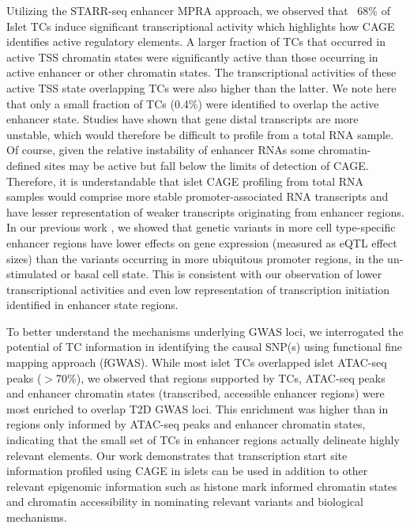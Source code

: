 Utilizing the STARR-seq enhancer MPRA approach, we observed that ~68\% of Islet TCs induce significant transcriptional activity which highlights how CAGE identifies active regulatory elements. A larger fraction of TCs that occurred in active TSS chromatin states were significantly active than those occurring in active enhancer or other chromatin states. The transcriptional activities of these active TSS state overlapping TCs were also higher than the latter. We note here that only a small fraction of TCs (0.4\%) were identified to overlap the active enhancer state. Studies have shown that gene distal transcripts are more unstable, which would therefore be difficult to profile from a total RNA sample. Of course, given the relative instability of enhancer RNAs some chromatin-defined sites may be active but fall below the limits of detection of CAGE. Therefore, it is understandable that islet CAGE profiling from total RNA samples would comprise more stable promoter-associated RNA transcripts and have lesser representation of weaker transcripts originating from enhancer regions. In our previous work \cite{varshneyCellSpecificityHuman2018}, we showed that genetic variants in more cell type-specific enhancer regions have lower effects on gene expression (measured as eQTL effect sizes) than the variants occurring in more ubiquitous promoter regions, in the un-stimulated or basal cell state. This is consistent with our observation of lower transcriptional activities and even low representation of transcription initiation identified in enhancer state regions.
   
To better understand the mechanisms underlying GWAS loci, we interrogated the potential of TC information in identifying the causal SNP(s) using functional fine mapping approach (fGWAS). While most islet TCs overlapped islet ATAC-seq peaks ($>$70\%), we observed that regions supported by TCs, ATAC-seq peaks and enhancer chromatin states (transcribed, accessible enhancer regions) were most enriched to overlap T2D GWAS loci. This enrichment was higher than in regions only informed by ATAC-seq peaks and enhancer chromatin states, indicating that the small set of TCs in enhancer regions actually delineate highly relevant elements. Our work demonstrates that transcription start site information profiled using CAGE in islets can be used in addition to other relevant epigenomic information such as histone mark informed chromatin states and chromatin accessibility in nominating relevant variants and biological mechanisms.


